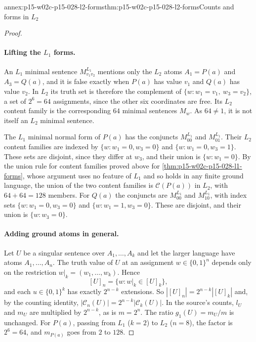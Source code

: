 \begin{annexitem}{annex:p15-w02c-p15-028-l2-forms}{thm:p15-w02c-p15-028-l2-forms}{Counts and forms in \(L_2\)}
\begin{proof}
\paragraph{Lifting the \(L_1\) forms.}
An \(L_1\) minimal sentence \(M^{L_1}_{v_1v_2}\) mentions only the
\(L_2\) atoms \(A_1=P(a)\) and \(A_3=Q(a)\), and it is false exactly
when \(P(a)\) has value \(v_1\) and \(Q(a)\) has value \(v_2\). In
\(L_2\) its truth set is therefore the complement of
\(\{w:w_1=v_1,\ w_3=v_2\}\), a set of \(2^6=64\) assignments, since the
other six coordinates are free. Its \(L_2\) content family is the
corresponding \(64\) minimal sentences \(M_w\). As \(64\neq 1\), it is
not itself an \(L_2\) minimal sentence.

The \(L_1\) minimal normal form of \(P(a)\) has the conjuncts
\(M^{L_1}_{00}\) and \(M^{L_1}_{01}\). Their \(L_2\) content families
are indexed by \(\{w:w_1=0,w_3=0\}\) and \(\{w:w_1=0,w_3=1\}\). These
sets are disjoint, since they differ at \(w_3\), and their union is
\(\{w:w_1=0\}\). By the union rule for content families proved above for
\cref{thm:p15-w02c-p15-028-l1-forms}, whose argument uses no feature
of \(L_1\) and so holds in any finite ground language, the union of the two content families is
\(\mathcal C(P(a))\) in \(L_2\), with \(64+64=128\) members. For
\(Q(a)\) the conjuncts are \(M^{L_1}_{00}\) and \(M^{L_1}_{10}\), with
index sets \(\{w:w_1=0,w_3=0\}\) and \(\{w:w_1=1,w_3=0\}\). These are
disjoint, and their union is \(\{w:w_3=0\}\).

\paragraph{Adding ground atoms in general.}
Let \(U\) be a singular sentence over \(A_1,\ldots,A_k\) and let the
larger language have atoms \(A_1,\ldots,A_n\). The truth value of \(U\)
at an assignment \(w\in\{0,1\}^n\) depends only on the restriction
\(w|_k=(w_1,\ldots,w_k)\). Hence
\[
 [U]_n=\{w:w|_k\in[U]_k\},
\]
and each \(u\in\{0,1\}^k\) has exactly \(2^{n-k}\) extensions. So
\(|[U]_n|=2^{n-k}|[U]_k|\) and, by the counting identity,
\(|\mathcal C_n(U)|=2^{n-k}|\mathcal C_k(U)|\). In the source's counts,
\(l_U\) and \(m_U\) are multiplied by \(2^{n-k}\), as is \(m=2^n\).
The ratio \(g_1(U)=m_U/m\) is unchanged. For \(P(a)\), passing from
\(L_1\) (\(k=2\)) to \(L_2\) (\(n=8\)), the factor is \(2^6=64\), and
\(m_{P(a)}\) goes from \(2\) to \(128\).
\end{proof}
\end{annexitem}

